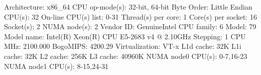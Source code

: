\documentclass[a4paper]{article}
\begin{document}
\pagebreak
\begin{verbnobox}[\footnotesize]
Architecture:          x86_64
CPU op-mode(s):        32-bit, 64-bit
Byte Order:            Little Endian
CPU(s):                32
On-line CPU(s) list:   0-31
Thread(s) per core:    1
Core(s) per socket:    16
Socket(s):             2
NUMA node(s):          2
Vendor ID:             GenuineIntel
CPU family:            6
Model:                 79
Model name:            Intel(R) Xeon(R) CPU E5-2683 v4 @ 2.10GHz
Stepping:              1
CPU MHz:               2100.000
BogoMIPS:              4200.29
Virtualization:        VT-x
L1d cache:             32K
L1i cache:             32K
L2 cache:              256K
L3 cache:              40960K
NUMA node0 CPU(s):     0-7,16-23
NUMA node1 CPU(s):     8-15,24-31
\end{verbnobox}
\end{document}
